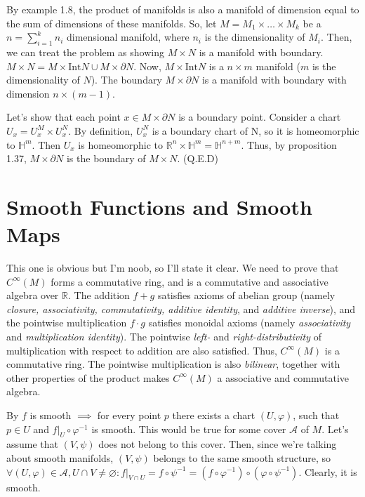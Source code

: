 \documentclass[a4paper]{article}
\begin{document}
\begin{exercise}[1-12]
    By example 1.8, the product of manifolds is also a manifold of dimension
    equal to the sum of dimensions of these manifolds. So, let $M = M_1 \times \dots \times M_k$
    be a $n = \sum_{i=1}^k n_i$ dimensional manifold, where $n_i$ is the dimensionality
    of $M_i$. Then, we can treat the problem as showing $M \times N$ is a manifold with
    boundary. $M \times N = M\times \text{Int}N \cup M\times \partial N$. Now,
    $M \times \text{Int}N$ is a $n\times m$ manifold ($m$ is the dimensionality of $N$).
    The boundary $M \times \partial N$ is a manifold with boundary with dimension
    $n \times (m-1)$.

    Let's show that each point $x \in M\times \partial N$ is a boundary point.
    Consider a chart $U_x = U^M_x \times U^N_x$. By definition, $U^N_x$ is a
    boundary chart of N, so it is homeomorphic to $\mathbb{H}^m$. Then $U_x$ is
    homeomorphic to $\mathbb{R}^n \times \mathbb{H}^m = \mathbb{H}^{n+m}$. Thus,
    by proposition 1.37, $M \times \partial N$ is the boundary of $M \times N$. (Q.E.D)
\end{exercise}




\section{Smooth Functions and Smooth Maps}

\begin{note}[on ex. 2.1]
    This one is obvious but I'm noob, so I'll state it clear. We need to prove that $C^\infty(M)$ forms a commutative ring, and is a commutative
    and associative algebra over $\mathbb{R}$. The addition $f+g$ satisfies
    axioms of abelian group (namely \textit{closure, associativity, commutativity,
    additive identity}, and \textit{additive inverse}), and the pointwise multiplication
    $f \cdot g$ satisfies monoidal axioms (namely \textit{associativity} and
    \textit{multiplication identity}). The pointwise  \textit{left-} and
    \textit{right-distributivity} of multiplication with respect to addition are also
    satisfied. Thus, $C^\infty(M)$ is a commutative ring. The pointwise multiplication
    is also \textit{bilinear}, together with other properties of the product
    makes $C^\infty(M)$ a associative and commutative algebra.
\end{note}

\begin{note}[on ex. 2.3]
    By $f$ is smooth $\implies$ for every point $p$ there exists a chart $(U, \varphi)$,
    such that $p \in U$ and $ f|_U \circ \varphi^{-1}$ is smooth. This would be
    true for some cover $\mathcal{A}$ of $M$. Let's assume that $(V, \psi)$ does not belong to this cover.
    Then, since we're talking about smooth manifolds, $(V, \psi)$ belongs to the
    same smooth structure, so
    $\forall (U, \varphi) \in \mathcal{A}, U \cap V \ne \varnothing \colon f|_{V\cap U} = f \circ \psi^{-1} = (f \circ \varphi^{-1}) \circ (\varphi \circ \psi^{-1})$.
    Clearly, it is smooth.
\end{note}
\end{document}
